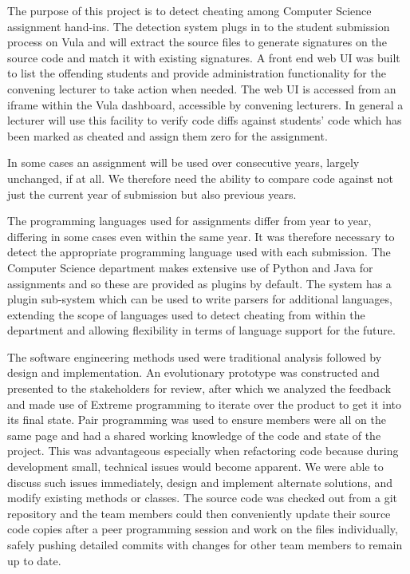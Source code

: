 \documentclass[11pt,a4paper]{article}
\begin{document}
The purpose of this project is to detect cheating among Computer Science
assignment hand-ins. The detection system plugs in to the student submission process on
Vula and will extract the source files to generate signatures on the source code and match
it with existing signatures. A front end web UI was built to list the offending students and
provide administration functionality for the convening lecturer to take action when needed. The web UI
is accessed from an iframe within the Vula dashboard, accessible by convening lecturers.
In general a lecturer will use this facility to verify code diffs against
students' code which has been marked as cheated and assign them zero for the assignment.

In some cases an assignment will be used over consecutive years, largely unchanged, if at all.
We therefore need the ability to compare code against not just the current year of submission
but also previous years.

The programming languages used for assignments differ from year to year, differing in some cases
even within the same year. It was therefore necessary to detect the appropriate programming language 
used with each submission. The Computer Science department makes extensive use of Python and Java for
assignments and so these are provided as plugins by default. The system has a plugin sub-system
which can be used to write parsers for additional languages, extending the scope of languages used
to detect cheating from within the department and allowing flexibility in terms of language support for
the future.

The software engineering methods used were traditional analysis followed by design and
implementation. An evolutionary prototype was constructed and presented to the stakeholders
for review, after which we analyzed the feedback and made use of Extreme programming to iterate over the product to get it into its
final state. Pair programming was used to ensure members were all on the same page and had
a shared working knowledge of the code and state of the project. This was advantageous especially
when refactoring code because during development small, technical issues would become
apparent. We were able to discuss such issues immediately, design and implement alternate
solutions, and modify existing methods or classes. The source code was checked out from
a git repository and the team members could then conveniently update their source code copies
after a peer programming session and work on the files individually, safely pushing detailed
commits with changes for other team members to remain up to date.
\end{document}
